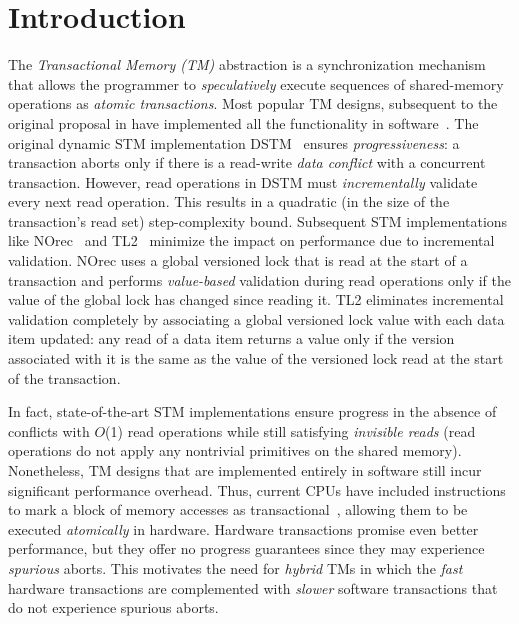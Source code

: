\section{Introduction}
\label{sec:intro}
%
%
The \emph{Transactional Memory (TM)} abstraction is a synchronization mechanism 
that allows the programmer to \emph{speculatively} execute sequences of shared-memory
operations as \emph{atomic transactions}.
Most popular TM designs, subsequent to the original proposal in \cite{HM93} 
have implemented all the functionality in software~\cite{norec, ST95,HLM+03, astm, fraser}.
The original dynamic STM implementation DSTM~\cite{HLM+03} ensures \emph{progressiveness}: 
a transaction aborts only if there is a read-write \emph{data conflict} with a concurrent
transaction. However, read operations in DSTM must \emph{incrementally} validate
every next read operation. This results in a quadratic  (in the size of the transaction's read
set) step-complexity bound. Subsequent STM 
implementations like NOrec~\cite{norec} and TL2~\cite{DSS06}
minimize the impact on performance due to incremental validation.
NOrec uses a global versioned lock that is read at the start of a transaction and performs \emph{value-based}
validation during read operations only if the value of the global lock has changed since reading it.
TL2 eliminates incremental validation completely by associating a global versioned lock
value with each data item updated: any read of a data item returns
a value only if the version associated with it is the same as the 
value of the versioned lock read at the start of the transaction. 

In fact, state-of-the-art STM implementations ensure progress in the absence of conflicts with 
$O$(1) read operations while still satisfying \emph{invisible reads} (read operations 
do not apply any nontrivial primitives on the shared memory).
Nonetheless, TM designs that are implemented entirely in software still incur significant performance overhead.
Thus, current CPUs have included instructions to mark a block of memory accesses as transactional~\cite{Rei12, asf, bluegene}, allowing them to be executed \emph{atomically} in hardware.
Hardware transactions promise even better performance, but they offer no progress guarantees 
since they may experience %
\emph{spurious} aborts. This motivates the need for
\emph{hybrid} TMs in which the \emph{fast} hardware transactions are 
complemented with \emph{slower} software transactions that do not experience spurious aborts.

